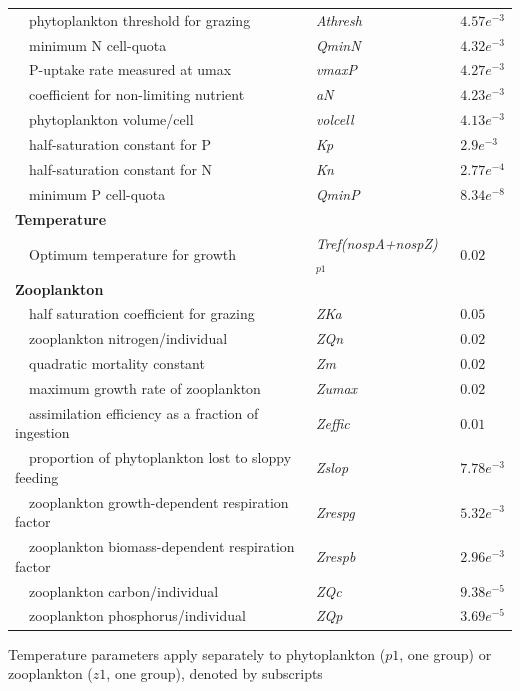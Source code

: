 \documentclass[review]{elsarticle}\usepackage[]{graphicx}\usepackage[]{color}
\begin{document}
\begin{table}[!tbp]
{\begin{center}
\begin{tabular}{lll}
~~phytoplankton threshold for grazing&\textit{Athresh}&$4.57e^{-3}$\tabularnewline
~~minimum N cell-quota&\textit{QminN}&$4.32e^{-3}$\tabularnewline
~~P-uptake rate measured at umax&\textit{vmaxP}&$4.27e^{-3}$\tabularnewline
~~coefficient for non-limiting nutrient&\textit{aN}&$4.23e^{-3}$\tabularnewline
~~phytoplankton volume/cell&\textit{volcell}&$4.13e^{-3}$\tabularnewline
~~half-saturation constant for P&\textit{Kp}&$2.9e^{-3}$\tabularnewline
~~half-saturation constant for N&\textit{Kn}&$2.77e^{-4}$\tabularnewline
~~minimum P cell-quota&\textit{QminP}&$8.34e^{-8}$\tabularnewline
\hline
{\bfseries Temperature}&&\tabularnewline
~~Optimum temperature for growth&\textit{Tref(nospA+nospZ)$_{p1}$}&$0.02$\tabularnewline
\hline
{\bfseries Zooplankton}&&\tabularnewline
~~half saturation coefficient for grazing&\textit{ZKa}&$0.05$\tabularnewline
~~zooplankton nitrogen/individual&\textit{ZQn}&$0.02$\tabularnewline
~~quadratic mortality constant&\textit{Zm}&$0.02$\tabularnewline
~~maximum growth rate of zooplankton&\textit{Zumax}&$0.02$\tabularnewline
~~assimilation efficiency as a fraction of ingestion&\textit{Zeffic}&$0.01$\tabularnewline
~~proportion of phytoplankton lost to sloppy feeding&\textit{Zslop}&$7.78e^{-3}$\tabularnewline
~~zooplankton growth-dependent respiration factor&\textit{Zrespg}&$5.32e^{-3}$\tabularnewline
~~zooplankton biomass-dependent respiration factor&\textit{Zrespb}&$2.96e^{-3}$\tabularnewline
~~zooplankton carbon/individual&\textit{ZQc}&$9.38e^{-5}$\tabularnewline
~~zooplankton phosphorus/individual&\textit{ZQp}&$3.69e^{-5}$\tabularnewline
\hline
\end{tabular}\end{center}}
\footnotesize *Temperature parameters apply separately to phytoplankton ($p1$, one group) or zooplankton ($z1$, one group), denoted by subscripts\end{table}
\end{document}
